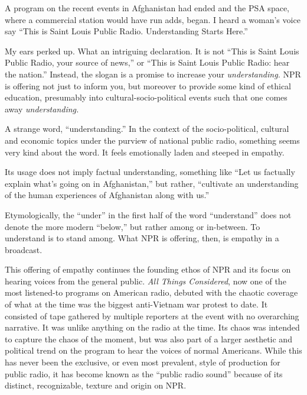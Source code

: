 \documentclass[12pt,letterpaper]{article}
\begin{document}
	A program on the recent events in Afghanistan had ended and the PSA 
	space, where a commercial station
	would have run adds, began. I heard a woman's voice say ``This is Saint
	Louis Public Radio. Understanding Starts Here.'' 

	My ears perked up. What an intriguing declaration. It is not ``This is 
	Saint Louis Public Radio, your source of news,'' or ``This is Saint 
	Louis Public Radio: hear the nation.'' Instead, the 
	slogan is a 
	promise to increase your \textit{understanding. }NPR is offering not
	just to 
	inform you, but moreover to provide some kind of ethical education,
	presumably into cultural-socio-political events such that one comes away
	\textit{understanding.}

	A strange word, ``understanding.'' In the context of the 
	socio-political,
	cultural and economic topics under the purview of national public 
	radio, something seems very kind about the word. It feels emotionally
	laden and steeped in empathy. 

	Its usage does not imply factual understanding, something like ``Let
	us factually explain what's going on in Afghanistan,'' but rather, 
	``cultivate an understanding of the human experiences of Afghanistan 
	along with us.'' 

	Etymologically, the ``under'' in the first half of the word 
	``understand'' does not denote the more modern ``below,'' but rather 
	among or in-between. \autocite{Ety} To understand is to stand among. 
	What NPR is offering, then, is empathy in a broadcast. 

	This offering of empathy continues the founding ethos of NPR 
	and its focus on hearing voices from the general public. 
	\textit{All Things Considered}, now one of the most listened-to programs
	on American radio, debuted with the chaotic coverage of
	what at the time was the biggest anti-Vietnam war protest to date. It
	consisted of tape gathered by multiple reporters at the event with no 
	overarching narrative. It was unlike anything on the radio at the time.
	Its chaos was intended to capture the chaos of the moment, but was also
	part of a larger aesthetic and political trend on the program to hear 
	the voices of normal Americans. While this has never been the exclusive,
	or even most prevalent, style of production for public radio, it has 
	become known as the ``public radio sound'' because of its distinct, 
	recognizable, texture and origin on NPR. 
\end{document}
